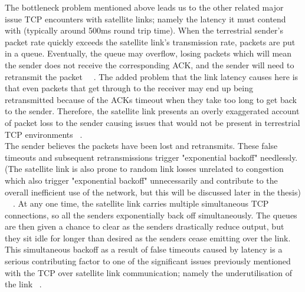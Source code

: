 The bottleneck problem mentioned above leads us to the other related major issue TCP encounters with satellite links; namely the latency it must contend with (typically around 500ms round trip time). When the terrestrial sender's packet rate quickly exceeds the satellite link’s transmission rate, packets are put in a queue. Eventually, the queue may overflow, losing packets which will mean the sender does not receive the corresponding ACK, and the sender will need to retransmit the packet ~\cite{11}~\cite{13}. The added problem that the link latency causes here is that even packets that get through to the receiver may end up being retransmitted because of the ACKs timeout when they take too long to get back to the sender. Therefore, the satellite link presents an overly exaggerated account of packet loss to the sender causing issues that would not be present in terrestrial TCP environments ~\cite{13}.\\

The sender believes the packets have been lost and retransmits. These false timeouts and subsequent retransmissions trigger "exponential backoff" needlessly. (The satellite link is also prone to random link losses unrelated to congestion which also trigger "exponential backoff" unnecessarily and contribute to the overall inefficient use of the network, but this will be discussed later in the thesis) ~\cite{13}~\cite{14}. At any one time, the satellite link carries multiple simultaneous TCP connections, so all the senders exponentially back off simultaneously.  The queues are then given a chance to clear as the senders drastically reduce output, but they sit idle for longer than desired as the senders cease emitting over the link. This simultaneous backoff as a result of false timeouts caused by latency is a serious contributing factor to one of the significant issues previously mentioned with the TCP over satellite link communication; namely the underutilisation of the link ~\cite{13}.\\


